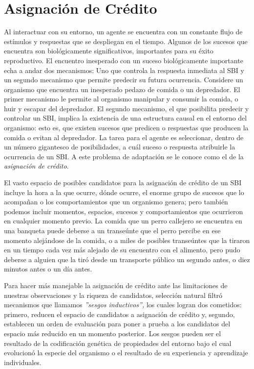 \documentclass[
  a4paper,
  DIV=11,
  numbers=noendperiod]{scrreprt}
\begin{document}

\chapter{Asignación de Crédito}\label{asignaciuxf3n-de-cruxe9dito}

Al interactuar con su entorno, un agente se encuentra con un constante
flujo de estímulos y respuestas que se despliegan en el tiempo. Algunos
de los sucesos que encuentra son biológicamente significativos,
importantes para su éxito reproductivo. El encuentro inesperado con un
suceso biológicamente importante echa a andar dos mecanismos: Uno que
controla la respuesta inmediata al SBI y un segundo mecanismo que
permite predecir su futura ocurrencia. Considere un organismo que
encuentra un inesperado pedazo de comida o un depredador. El primer
mecanismo le permite al organismo manipular y consumir la comida, o huir
y escapar del depredador. El segundo mecanismo, el que posibilita
predecir y controlar un SBI, implica la existencia de una estructura
causal en el entorno del organismo: esto es, que existen sucesos que
predicen o respuestas que producen la comida o evitan al depredador. La
tarea para el agente es seleccionar, dentro de un número gigantesco de
posibilidades, a cuál suceso o respuesta atribuirle la ocurrencia de un
SBI. A este problema de adaptación se le conoce como el de la
\emph{asignación de crédito}.

El vasto espacio de posibles candidatos para la asignación de crédito de
un SBI incluye la hora a la que ocurre, dónde ocurre, el enorme grupo de
sucesos que lo acompañan o los comportamientos que un organismo genera;
pero también podemos incluir momentos, espacios, sucesos y
comportamientos que ocurrieron en cualquier momento previo. La comida
que un perro callejero se encuentra en una banqueta puede deberse a un
transeúnte que el perro percibe en ese momento alejándose de la comida,
o a miles de posibles transeúntes que la tiraron en un tiempo cada vez
más alejado de su encuentro con el alimento, pero pudo deberse a alguien
que la tiró desde un transporte público un segundo antes, o diez minutos
antes o un día antes.

Para hacer más manejable la asignación de crédito ante las limitaciones
de nuestras observaciones y la riqueza de candidatos, selección natural
filtró mecanismos que llamamos \emph{''sesgos inductivos'',} los cuales
logran dos cometidos: primero, reducen el espacio de candidatos a
asignación de crédito y, segundo, establecen un orden de evaluación para
poner a prueba a los candidatos del espacio más reducido en un momento
posterior. Los sesgos pueden ser el resultado de la codificación
genética de propiedades del entorno bajo el cual evolucionó la especie
del organismo o el resultado de su experiencia y aprendizaje
individuales.
\end{document}
